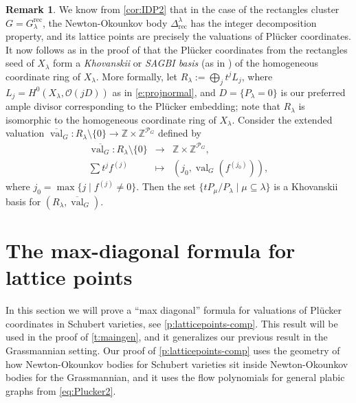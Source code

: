 \documentclass{amsart}
\theoremstyle{definition}
\newtheorem{remark}[thm]{Remark}
\numberwithin{equation}{section}
\newcommand{\rect}{\mathrm{rec}}
\newcommand{\Z}{\mathbb{Z}}
\newcommand{\val}{{\operatorname{val}}}
\begin{document}
\begin{remark} \label{rem:Khovanskii}
We know  from  \cref{cor:IDP2}
that in the case of the rectangles cluster $G=G_{\lambda}^{\rect}$,
the Newton-Okounkov body
 $\Delta_{\rect}^{\lambda}$ has the integer decomposition property,
and its lattice points are precisely
the valuations of Pl\"ucker coordinates.
It now follows as in the proof of \cite[Corollary 17.10]{RW}
that the Pl\"ucker coordinates from the rectangles seed of 
$X_{\lambda}$ form a \emph{Khovanskii} or \emph{SAGBI basis} 
(as in \cite[Definition 17.1]{RW})
of the homogeneous coordinate ring of $X_{\lambda}$.  More formally,
let
	$R_{\lambda}:=\bigoplus_j t^j L_j$, where
	$L_j=H^0(X_{\lambda},\mathcal O(jD))$ 
	as in \eqref{e:projnormal}, and 
	$D=\{P_{\lambda}=0\}$ is our preferred ample divisor corresponding to the 
	Pl\"ucker embedding;
	note that $R_{\lambda}$ is isomorphic to the homogeneous 
	coordinate ring of $X_{\lambda}$. 
	Consider the extended valuation $\overline \val_G:R_{\lambda} \setminus\{0\}\to 
	\Z\times \Z^{\mathcal P_G}$ defined by
	\begin{eqnarray}\label{e:extendedval}
		\overline{\val_G}: R_{\lambda}\setminus\{0\}&\to &\Z\times \Z^{\mathcal P_G},\\
\sum t^j f^{(j)} &\mapsto & \left(j_0,\val_G (f^{(j_0)})\right),
\end{eqnarray}
where $j_0=\max\{j\mid f^{(j)}\ne 0\}$.
Then
%
the set  $\{tP_{\mu}/P_\lambda\mid \mu\subseteq \lambda\}$ is a Khovanskii basis for
	$(R_{\lambda}, \overline{\val}_G)$.%
\end{remark}











\section{The max-diagonal formula for lattice points}\label{s:MaxDiag}





In this section we will prove a  ``max diagonal'' formula for valuations
of Pl\"ucker coordinates in Schubert varieties, see \cref{p:latticepoints-comp}.
This result will be used in the proof of 
\cref{t:maingen}, and it 
generalizes 
our previous result  \cite[Theorem 15.1]{RW} in the  Grassmannian setting.
Our proof of 
\cref{p:latticepoints-comp}
uses the geometry of how Newton-Okounkov bodies for Schubert varieties
sit inside Newton-Okounkov bodies for the Grassmannian, and it uses
the flow polynomials for general plabic graphs from \eqref{eq:Plucker2}.
\end{document}
